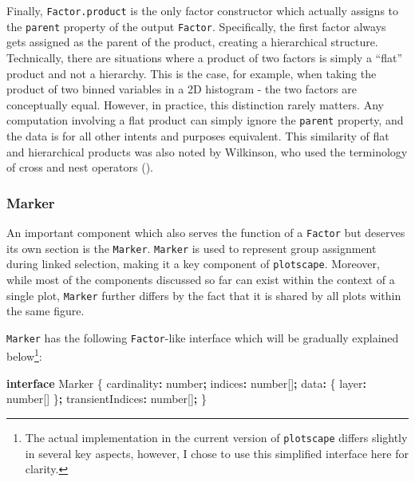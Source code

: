 \documentclass[
  openany]{book}
\newenvironment{Shaded}{\begin{snugshade}}{\end{snugshade}}
\newcommand{\DataTypeTok}[1]{\textcolor[rgb]{0.13,0.29,0.53}{#1}}
\newcommand{\KeywordTok}[1]{\textcolor[rgb]{0.13,0.29,0.53}{\textbf{#1}}}
\newcommand{\NormalTok}[1]{#1}
\newcommand{\OperatorTok}[1]{\textcolor[rgb]{0.81,0.36,0.00}{\textbf{#1}}}
\theoremstyle{definition}
\theoremstyle{definition}
\theoremstyle{definition}
\theoremstyle{definition}
\theoremstyle{remark}
\begin{document}
Finally, \texttt{Factor.product} is the only factor constructor which actually assigns to the \texttt{parent} property of the output \texttt{Factor}. Specifically, the first factor always gets assigned as the parent of the product, creating a hierarchical structure. Technically, there are situations where a product of two factors is simply a ``flat'' product and not a hierarchy. This is the case, for example, when taking the product of two binned variables in a 2D histogram - the two factors are conceptually equal. However, in practice, this distinction rarely matters. Any computation involving a flat product can simply ignore the \texttt{parent} property, and the data is for all other intents and purposes equivalent. This similarity of flat and hierarchical products was also noted by Wilkinson, who used the terminology of cross and nest operators ().

\subsubsection{Marker}\label{marker}

An important component which also serves the function of a \texttt{Factor} but deserves its own section is the \texttt{Marker}. \texttt{Marker} is used to represent group assignment during linked selection, making it a key component of \texttt{plotscape}. Moreover, while most of the components discussed so far can exist within the context of a single plot, \texttt{Marker} further differs by the fact that it is shared by all plots within the same figure.

\texttt{Marker} has the following \texttt{Factor}-like interface which will be gradually explained below\footnote{The actual implementation in the current version of \texttt{plotscape} differs slightly in several key aspects, however, I chose to use this simplified interface here for clarity.}:

\begin{Shaded}
\begin{Highlighting}[]
\KeywordTok{interface}\NormalTok{ Marker \{}
\NormalTok{  cardinality}\OperatorTok{:} \DataTypeTok{number}\OperatorTok{;}
\NormalTok{  indices}\OperatorTok{:} \DataTypeTok{number}\NormalTok{[]}\OperatorTok{;}
\NormalTok{  data}\OperatorTok{:}\NormalTok{ \{ layer}\OperatorTok{:} \DataTypeTok{number}\NormalTok{[] \}}\OperatorTok{;}
\NormalTok{  transientIndices}\OperatorTok{:} \DataTypeTok{number}\NormalTok{[]}\OperatorTok{;}
\NormalTok{\}}
\end{Highlighting}
\end{Shaded}
\end{document}

